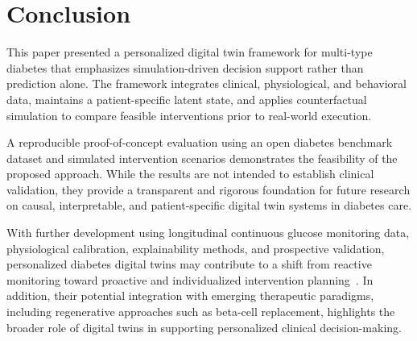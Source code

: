 \documentclass[journal]{IEEEtran}
\begin{document}
\section{Conclusion}
This paper presented a personalized digital twin framework for multi-type diabetes that emphasizes simulation-driven decision support rather than prediction alone. The framework integrates clinical, physiological, and behavioral data, maintains a patient-specific latent state, and applies counterfactual simulation to compare feasible interventions prior to real-world execution.

A reproducible proof-of-concept evaluation using an open diabetes benchmark dataset and simulated intervention scenarios demonstrates the feasibility of the proposed approach. While the results are not intended to establish clinical validation, they provide a transparent and rigorous foundation for future research on causal, interpretable, and patient-specific digital twin systems in diabetes care.

With further development using longitudinal continuous glucose monitoring data, physiological calibration, explainability methods, and prospective validation, personalized diabetes digital twins may contribute to a shift from reactive monitoring toward proactive and individualized intervention planning~\cite{ref4,ref7,ref16,ref20,ref22,ref35}. In addition, their potential integration with emerging therapeutic paradigms, including regenerative approaches such as beta-cell replacement, highlights the broader role of digital twins in supporting personalized clinical decision-making.
\end{document}
